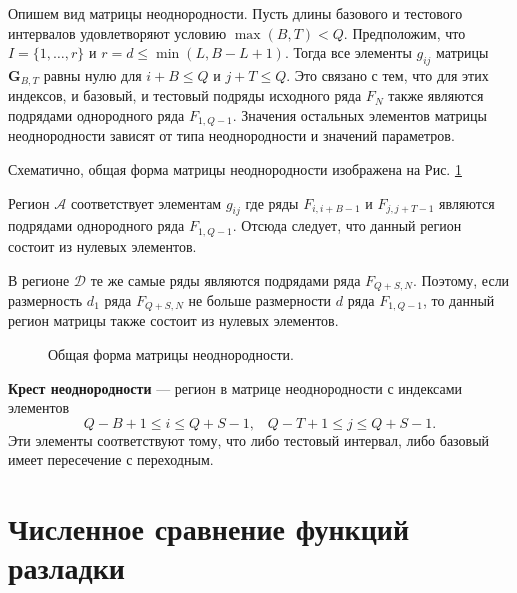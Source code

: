 \documentclass[specialist, substylefile = spbu.rtx,
			   subf, href, 12pt]{disser}
\begin{document}
Опишем вид матрицы неоднородности. Пусть длины базового и тестового интервалов удовлетворяют условию $ \max(B, T) < Q $. Предположим, что $ I = \{1, \dots, r\} $ и $ r = d \leq \min(L, B-L+1) $. Тогда все элементы $ g_{ij} $ матрицы $ \mathbf{G}_{B, T} $ равны нулю для $ i+B \leq Q $ и $ j+T \leq Q $. Это связано с тем, что для этих индексов, и базовый, и тестовый подряды исходного ряда $ F_N $ также являются подрядами однородного ряда $ F_{1, Q-1} $. Значения остальных элементов матрицы неоднородности зависят от типа неоднородности и значений параметров.

Схематично, общая форма матрицы неоднородности изображена на Рис. \ref{pic:general_form_G} 

Регион $ \mathcal{A} $ соответствует элементам $ g_{ij} $ где ряды $ F_{i, i+B-1} $ и $ F_{j, j+T-1} $ являются подрядами однородного ряда $ F_{1,Q-1} $. Отсюда следует, что данный регион состоит из нулевых элементов. 

В регионе $ \mathcal{D} $ те же самые ряды являются подрядами ряда $ F_{Q+S,N} $. Поэтому, если размерность $ d_1 $ ряда $ F_{Q+S, N} $ не больше размерности $ d $ ряда $ F_{1, Q-1} $, то данный регион матрицы также состоит из нулевых элементов.


\begin{figure}[h]
	\caption{Общая форма матрицы неоднородности.}
	\label{pic:general_form_G}
\end{figure}

\textbf{Крест неоднородности} --- регион в матрице неоднородности с индексами элементов
$$Q-B+1 \leq i \leq Q+S-1, \;\;\; Q-T+1 \leq j \leq Q+S-1.$$
Эти элементы соответствуют тому, что либо тестовый интервал, либо базовый имеет пересечение с переходным.

\newpage
\chapter{Численное сравнение функций разладки}\label{sec:ch_3}
\end{document}

